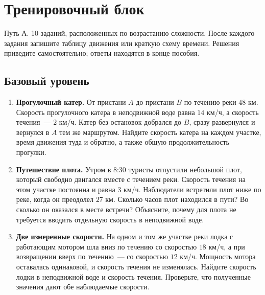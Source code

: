 \documentclass[a4paper,12pt]{article}
\begin{document}
\clearpage
\section*{Тренировочный блок}
\textcolor{soft}{Путь А. 10 заданий, расположенных по возрастанию сложности. После каждого задания запишите таблицу движения или краткую схему времени. Решения приведите самостоятельно; ответы находятся в конце пособия.}

\subsection*{Базовый уровень}
\begin{enumerate}[label=\textcolor{accent}{\bfseries\arabic*.},leftmargin=8mm,itemsep=8pt]
\item \textbf{Прогулочный катер.} От пристани $A$ до пристани $B$ по течению реки $48$ км. Скорость прогулочного катера в неподвижной воде равна $14$ км/ч, а скорость течения~--- $2$ км/ч. Катер без остановок добрался до $B$, сразу развернулся и вернулся в $A$ тем же маршрутом. Найдите скорость катера на каждом участке, время движения туда и обратно, а также общую продолжительность прогулки.

\item \textbf{Путешествие плота.} Утром в 8:30 туристы отпустили небольшой плот, который свободно двигался вместе с течением реки. Скорость течения на этом участке постоянна и равна $3$ км/ч. Наблюдатели встретили плот ниже по реке, когда он преодолел $27$ км. Сколько часов плот находился в пути? Во сколько он оказался в месте встречи? Объясните, почему для плота не требуется вводить отдельную скорость в неподвижной воде.

\item \textbf{Две измеренные скорости.} На одном и том же участке реки лодка с работающим мотором шла вниз по течению со скоростью $18$ км/ч, а при возвращении вверх по течению~--- со скоростью $12$ км/ч. Мощность мотора оставалась одинаковой, и скорость течения не изменялась. Найдите скорость лодки в неподвижной воде и скорость течения. Проверьте, что полученные значения дают обе наблюдаемые скорости.
\end{enumerate}
\end{document}
